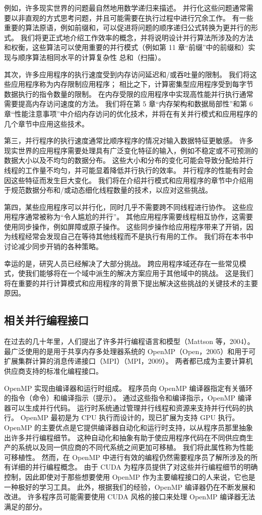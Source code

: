 例如，许多现实世界的问题最自然地用数学递归来描述。 并行化这些问题通常需要以非直观的方式思考问题，并且可能需要在执行过程中进行冗余工作。 有一些重要的算法原语，例如前缀和，可以促进将问题的顺序递归公式转换为更并行的形式。 我们将更正式地介绍工作效率的概念，并将说明设计并行算法所涉及的方法和权衡，这些算法可以使用重要的并行模式（例如第 11 章“前缀”中的前缀和）实现与顺序算法相同水平的计算复杂性 总和（扫描）。

其次，许多应用程序的执行速度受到内存访问延迟和/或吞吐量的限制。 我们将这些应用程序称为内存限制应用程序； 相比之下，计算密集型应用程序受到每字节数据执行的指令数量的限制。 在内存受限的应用程序中实现高性能并行执行通常需要提高内存访问速度的方法。 我们将在第 5 章“内存架构和数据局部性”和第 6 章“性能注意事项”中介绍内存访问的优化技术，并将在有关并行模式和应用程序的几个章节中应用这些技术。

第三，并行程序的执行速度通常比顺序程序的情况对输入数据特征更敏感。 许多现实世界的应用程序需要处理具有广泛变化特征的输入，例如不稳定或不可预测的数据大小以及不均匀的数据分布。 这些大小和分布的变化可能会导致分配给并行线程的工作量不均匀，并可能显着降低并行执行的效率。 并行程序的性能有时会因这些特征而发生巨大变化。 我们将在介绍并行模式和应用程序的章节中介绍用于规范数据分布和/或动态细化线程数量的技术，以应对这些挑战。

第四，某些应用程序可以并行化，同时几乎不需要跨不同线程进行协作。 这些应用程序通常被称为“令人尴尬的并行”。 其他应用程序需要线程相互协作，这需要使用同步操作，例如屏障或原子操作。 这些同步操作给应用程序带来了开销，因为线程经常会发现自己在等待其他线程而不是执行有用的工作。 我们将在本书中讨论减少同步开销的各种策略。

幸运的是，研究人员已经解决了大部分挑战。 跨应用程序域还存在一些常见模式，使我们能够将在一个域中派生的解决方案应用于其他域中的挑战。 这是我们将在重要的并行计算模式和应用程序的背景下提出解决这些挑战的关键技术的主要原因。

\subsection{相关并行编程接口}
在过去的几十年里，人们提出了许多并行编程语言和模型（Mattson 等，2004）。 最广泛使用的是用于共享内存多处理器系统的 OpenMP（Open，2005）和用于可扩展集群计算的消息传递接口（MPI）（MPI，2009）。 两者都已成为主要计算机供应商支持的标准化编程接口。

OpenMP 实现由编译器和运行时组成。 程序员向 OpenMP 编译器指定有关循环的指令（命令）和编译指示（提示）。 通过这些指令和编译指示，OpenMP 编译器可以生成并行代码。 运行时系统通过管理并行线程和资源来支持并行代码的执行。 OpenMP 最初是为 CPU 执行而设计的，现已扩展为支持 GPU 执行。 OpenMP 的主要优点是它提供编译器自动化和运行时支持，以从程序员那里抽象出许多并行编程细节。 这种自动化和抽象有助于使应用程序代码在不同供应商生产的系统以及同一供应商的不同代系统之间更加可移植。 我们将此属性称为性能可移植性。 然而，在 OpenMP 中进行有效的编程仍然需要程序员了解所涉及的所有详细的并行编程概念。 由于 CUDA 为程序员提供了对这些并行编程细节的明确控制，因此即使对于那些想要使用 OpenMP 作为主要编程接口的人来说，它也是一种极好的学习工具。 此外，根据我们的经验，OpenMP 编译器仍在不断发展和改进。 许多程序员可能需要使用 CUDA 风格的接口来处理 OpenMP 编译器无法满足的部分。

